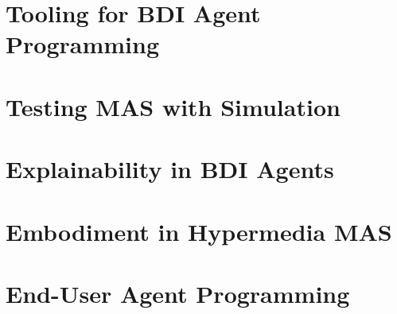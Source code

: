 \section{Tooling for \acs{BDI} Agent Programming}

\section{Testing \acs{MAS} with Simulation}

\section{Explainability in \acs{BDI} Agents}

\section{Embodiment in Hypermedia \acs{MAS}}

\section{End-User Agent Programming}
